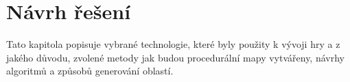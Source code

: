 \chapter{Návrh řešení}
\label{solution}
Tato kapitola popisuje vybrané technologie, které byly použity k vývoji hry a z jakého důvodu, zvolené metody jak budou procedurální mapy vytvářeny, návrhy algoritmů a způsobů generování oblastí. 

